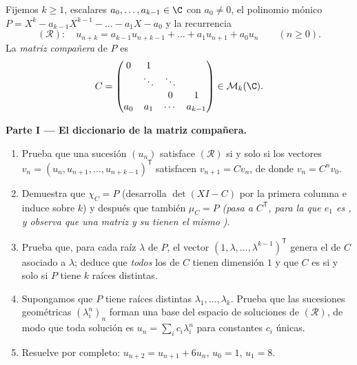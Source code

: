\begin{problem}
\label{pb:b2:reduction:1}
Fijemos $k \geq 1$, escalares $a_0, \dots, a_{k-1} \in \C$ con $a_0
\neq 0$, el polinomio mónico $P = X^k - a_{k-1}X^{k-1} - \dots - a_1
X - a_0$ y la recurrencia
\[
(\mathcal R)\colon\quad u_{n+k} = a_{k-1}u_{n+k-1} + \dots +
a_1 u_{n+1} + a_0 u_n \qquad (n \geq 0).
\]
La \emph{matriz compañera} de $P$ es
\[
C =
\begin{pmatrix}
0 & 1 & & \\
 & \ddots & \ddots & \\
 & & 0 & 1\\
a_0 & a_1 & \cdots & a_{k-1}
\end{pmatrix}
\in \mathcal{M}_k(\C).
\]

\medskip
\noindent\textbf{Parte I --- El diccionario de la matriz
compañera.}
\begin{enumerate}
  \item Prueba que una sucesión $(u_n)$ satisface $(\mathcal R)$ si
        y solo si los vectores $v_n = (u_n, u_{n+1}, \dots,
        u_{n+k-1})^{\mathsf T}$ satisfacen $v_{n+1} = Cv_n$, de
        donde $v_n = C^n v_0$.
  \item Demuestra que $\chi_C = P$ (desarrolla $\det(XI - C)$ por
        la primera columna e induce sobre $k$) y después que
        también $\mu_C = P$ \emph{(pasa a $C^{\mathsf T}$, para la
        que $e_1$ es , y observa que una matriz y su
         tienen el mismo )}.
  \item Prueba que, para cada raíz $\lambda$ de $P$, el vector $(1,
        \lambda, \dots, \lambda^{k-1})^{\mathsf T}$ genera el
         de $C$ asociado a $\lambda$; deduce que
        \emph{todos} los  de $C$ tienen
        dimensión $1$ y que $C$ es  si y solo si $P$
        tiene $k$ raíces distintas.
  \item Supongamos que $P$ tiene raíces distintas $\lambda_1, \dots,
        \lambda_k$. Prueba que las sucesiones geométricas
        $(\lambda_i^n)_n$ forman una base del espacio de soluciones
        de $(\mathcal R)$, de modo que toda solución es $u_n =
        \sum_i c_i\lambda_i^n$ para constantes $c_i$ únicas.
  \item Resuelve por completo: $u_{n+2} = u_{n+1} + 6u_n$, $u_0 =
        1$, $u_1 = 8$.
\end{enumerate}


\end{problem}
